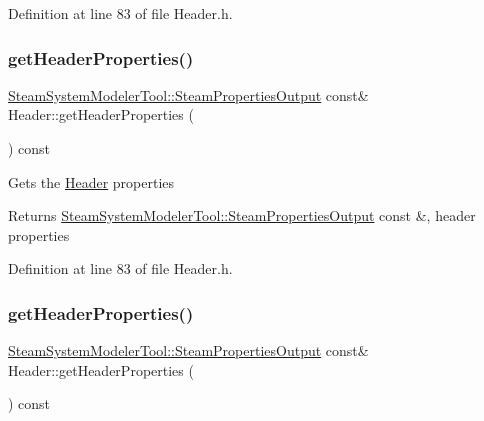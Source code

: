 Definition at line 83 of file Header.\+h.

\mbox{\label{class_header_a0d27b0e1b3c16cc24b4ba6f64abb7cb0}} 
\subsubsection{\texorpdfstring{get\+Header\+Properties()}{getHeaderProperties()}\hspace{0.1cm}{\footnotesize\ttfamily [2/3]}}
{\footnotesize\ttfamily \hyperlink{struct_steam_system_modeler_tool_1_1_steam_properties_output}{Steam\+System\+Modeler\+Tool\+::\+Steam\+Properties\+Output} const\& Header\+::get\+Header\+Properties (\begin{DoxyParamCaption}{ }\end{DoxyParamCaption}) const\hspace{0.3cm}{\ttfamily [inline]}}

Gets the \hyperlink{class_header}{Header} properties \begin{DoxyReturn}{Returns}
\hyperlink{struct_steam_system_modeler_tool_1_1_steam_properties_output}{Steam\+System\+Modeler\+Tool\+::\+Steam\+Properties\+Output} const \&, header properties 
\end{DoxyReturn}


Definition at line 83 of file Header.\+h.

\mbox{\label{class_header_a0d27b0e1b3c16cc24b4ba6f64abb7cb0}} 
\subsubsection{\texorpdfstring{get\+Header\+Properties()}{getHeaderProperties()}\hspace{0.1cm}{\footnotesize\ttfamily [3/3]}}
{\footnotesize\ttfamily \hyperlink{struct_steam_system_modeler_tool_1_1_steam_properties_output}{Steam\+System\+Modeler\+Tool\+::\+Steam\+Properties\+Output} const\& Header\+::get\+Header\+Properties (\begin{DoxyParamCaption}{ }\end{DoxyParamCaption}) const\hspace{0.3cm}{\ttfamily [inline]}}

